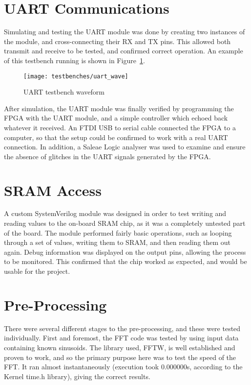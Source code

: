 \section{UART Communications} %
\label{sec:uart_communications_testing}
	Simulating and testing the UART module was done by creating two instances of the module, and cross-connecting their RX and TX pins.  This allowed both transmit and receive to be tested, and confirmed correct operation.  An example of this testbench running is shown in Figure~\ref{fig:test_uart}.

	\begin{figure}[tb]
		\begin{center}
			\texttt{[image: testbenches/uart\_wave]}
		\end{center}
		\caption{UART testbench waveform}
		\label{fig:test_uart}
	\end{figure}

	After simulation, the UART module was finally verified by programming the FPGA with the UART module, and a simple controller which echoed back whatever it received.  An FTDI USB to serial cable connected the FPGA to a computer, so that the setup could be confirmed to work with a real UART connection.  In addition, a Saleae Logic analyser was used to examine and ensure the absence of glitches in the UART signals generated by the FPGA.


\section{SRAM Access} %
\label{sec:sram_access_testing}
	A custom SystemVerilog module was designed in order to test writing and reading values to the on-board SRAM chip, as it was a completely untested part of the board.  The module performed fairly basic operations, such as looping through a set of values, writing them to SRAM, and then reading them out again.  Debug information was displayed on the output pins, allowing the process to be monitored.  This confirmed that the chip worked as expected, and would be usable for the project.


\section{Pre-Processing} %
\label{sec:pre_processing_testing}
	There were several different stages to the pre-processing, and these were tested individually.  First and foremost, the FFT code was tested by using input data containing known sinusoids.  The library used, FFTW, is well established and proven to work, and so the primary purpose here was to test the speed of the FFT.  It ran almost instantaneously (execution took 0.000000s, according to the Kernel time.h library), giving the correct results.

